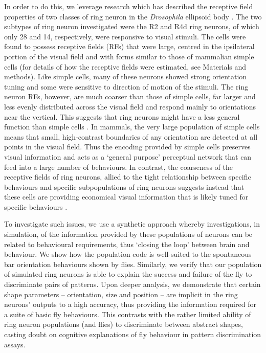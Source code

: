 In order to do this, we leverage research which has described the receptive field properties of two classes of ring neuron in the \emph{Drosophila} ellipsoid body \cite{Seelig2013}. The two subtypes of ring neuron investigated were the R2 and R4d ring neurons, of which only 28 and 14, respectively, were responsive to visual stimuli. The cells were found to possess receptive fields (RFs) that were large, centred in the ipsilateral portion of the visual field and with forms similar to those of mammalian simple cells \cite{Hubel1962} (for details of how the receptive fields were estimated, see Materials and methods). Like simple cells, many of these neurons showed strong orientation tuning and some were sensitive to direction of motion of the stimuli. The ring neuron RFs, however, are much coarser than those of simple cells, far larger and less evenly distributed across the visual field and respond mainly to orientations near the vertical. This suggests that ring neurons might have a less general function than simple cells \cite{Wystrach2014}. In mammals, the very large population of simple cells means that small, high-contrast boundaries of any orientation are detected at all points in the visual field. Thus the encoding provided by simple cells preserves visual information and acts as a `general purpose' perceptual network that can feed into a large number of behaviours. In contrast, the coarseness of the receptive fields of ring neurons, allied to the tight relationship between specific behaviours and specific subpopulations of ring neurons suggests instead that these cells are providing economical visual information that is likely tuned for specific behaviours \cite{Wystrach2014}.

To investigate such issues, we use a synthetic approach whereby investigations, in simulation, of the information provided by these populations of neurons can be related to behavioural requirements, thus `closing the loop' between brain and behaviour. We show how the population code is well-suited to the spontaneous bar orientation behaviours shown by flies. Similarly, we verify that our population of simulated ring neurons is able to explain the success and failure of the fly to discriminate pairs of patterns. Upon deeper analysis, we demonstrate that certain shape parameters -- orientation, size and position -- are implicit in the ring neurons' outputs to a high accuracy, thus providing the information required for a suite of basic fly behaviours. This contrasts with the rather limited ability of ring neuron populations (and flies) to discriminate between abstract shapes, casting doubt on cognitive explanations of fly behaviour in pattern discrimination assays.

